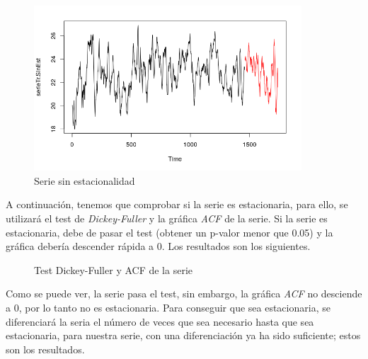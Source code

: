 \begin{figure}[H]
	\centering
	\includegraphics[width=100mm]{imagenes/no_estacional.png}
	\caption{Serie sin estacionalidad}
	\label{fig:7}
\end{figure}

A continuación, tenemos que comprobar si la serie es estacionaria, para ello, se utilizará el test de \textit{Dickey-Fuller} y la gráfica \textit{ACF} de la serie. Si la serie es estacionaria, debe de pasar el test (obtener un p-valor menor que 0.05) y la gráfica debería descender rápida a 0. Los resultados son los siguientes.

\begin{figure}[H]
	\centering
	\caption{Test Dickey-Fuller y ACF de la serie}
	\label{fig:8}
\end{figure}

Como se puede ver, la serie pasa el test, sin embargo, la gráfica \textit{ACF} no desciende a 0, por lo tanto no es estacionaria. Para conseguir que sea estacionaria, se diferenciará la seria el número de veces que sea necesario hasta que sea estacionaria, para nuestra serie, con una diferenciación ya ha sido suficiente; estos son los resultados.

